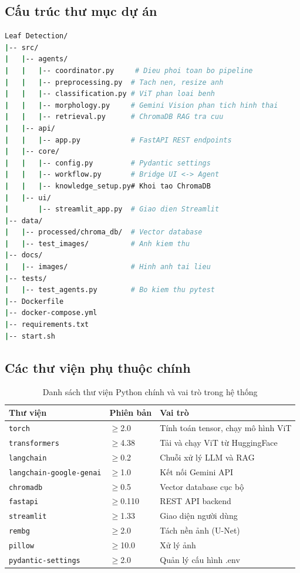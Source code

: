 \documentclass[13pt,a4paper]{extreport}
\begin{document}
\subsection{Cấu trúc thư mục dự án}
\begin{lstlisting}[language=bash, caption={Cấu trúc thư mục dự án Rice Disease Detection AI}, label={lst:dir_structure}, basicstyle=\ttfamily\small, numbers=none]
Leaf Detection/
|-- src/
|   |-- agents/
|   |   |-- coordinator.py     # Dieu phoi toan bo pipeline
|   |   |-- preprocessing.py  # Tach nen, resize anh
|   |   |-- classification.py # ViT phan loai benh
|   |   |-- morphology.py     # Gemini Vision phan tich hinh thai
|   |   |-- retrieval.py      # ChromaDB RAG tra cuu
|   |-- api/
|   |   |-- app.py            # FastAPI REST endpoints
|   |-- core/
|   |   |-- config.py         # Pydantic settings
|   |   |-- workflow.py       # Bridge UI <-> Agent
|   |   |-- knowledge_setup.py# Khoi tao ChromaDB
|   |-- ui/
|       |-- streamlit_app.py  # Giao dien Streamlit
|-- data/
|   |-- processed/chroma_db/  # Vector database
|   |-- test_images/          # Anh kiem thu
|-- docs/
|   |-- images/               # Hinh anh tai lieu
|-- tests/
|   |-- test_agents.py        # Bo kiem thu pytest
|-- Dockerfile
|-- docker-compose.yml
|-- requirements.txt
|-- start.sh
\end{lstlisting}

\subsection{Các thư viện phụ thuộc chính}
\begin{table}[H]
\centering
\caption{Danh sách thư viện Python chính và vai trò trong hệ thống}
\label{tab:dependencies}
\begin{tabular}{lll}
\toprule
\textbf{Thư viện} & \textbf{Phiên bản} & \textbf{Vai trò} \\
\midrule
\texttt{torch} & $\geq$2.0 & Tính toán tensor, chạy mô hình ViT \\
\texttt{transformers} & $\geq$4.38 & Tải và chạy ViT từ HuggingFace \\
\texttt{langchain} & $\geq$0.2 & Chuỗi xử lý LLM và RAG \\
\texttt{langchain-google-genai} & $\geq$1.0 & Kết nối Gemini API \\
\texttt{chromadb} & $\geq$0.5 & Vector database cục bộ \\
\texttt{fastapi} & $\geq$0.110 & REST API backend \\
\texttt{streamlit} & $\geq$1.33 & Giao diện người dùng \\
\texttt{rembg} & $\geq$2.0 & Tách nền ảnh (U-Net) \\
\texttt{pillow} & $\geq$10.0 & Xử lý ảnh \\
\texttt{pydantic-settings} & $\geq$2.0 & Quản lý cấu hình .env \\
\bottomrule
\end{tabular}
\end{table}
\end{document}
